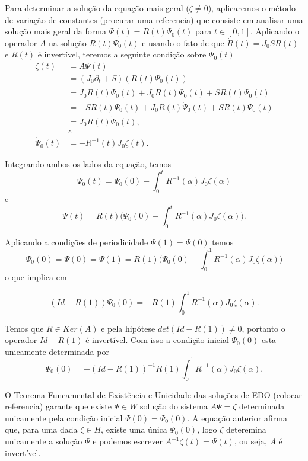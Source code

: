 \documentclass[12pt]{book}
\newcommand{\derivadaparcialabrev}[1]{\partial_{#1}}
\newcommand{\estruturacomplexa}{J_{0}}
\newcommand{\vermelho}[1]{{\color{red}#1}}
\begin{document}
	Para determinar a solução da equação mais geral ($\zeta\neq 0$), aplicaremos o método de variação de constantes \vermelho{(procurar uma referencia)} que consiste em analisar uma solução mais geral da forma $\Psi(t) = R(t)\Psi_{0}(t)$ para $t \in [0,1]$. Aplicando o operador $A$ na solução $R(t)\Psi_{0}(t)$ e usando o fato de que $\dot{R}(t) = \estruturacomplexa SR(t)$ e $R(t)$ é invertível, teremos a seguinte condição sobre $\Psi_{0}(t)$
	$$
	\begin{aligned}
		\zeta(t) 
		&= A\Psi(t)
		\\ 
		&= (\estruturacomplexa\derivadaparcialabrev{t}+S)(R(t)\Psi_{0}(t)) 
		\\ 
		&= \estruturacomplexa\dot{R}(t)\Psi_{0}(t)+\estruturacomplexa R(t)\dot{\Psi}_{0}(t) + SR(t)\Psi_{0}(t)
		\\
		&= -SR(t)\Psi_{0}(t)+\estruturacomplexa R(t)\dot{\Psi}_{0}(t) + SR(t)\Psi_{0}(t)
		\\
		&= \estruturacomplexa R(t)\dot{\Psi}_{0}(t),
		\\
		&\therefore 
		\\
		\dot{\Psi}_{0}(t) &= -R^{-1}(t)\estruturacomplexa \zeta(t).
	\end{aligned}
	$$
	
	Integrando ambos os lados da equação, temos
	$$
	\Psi_{0}(t) = \Psi_{0}(0)-\int_{0}^{t} R^{-1}(\alpha)\estruturacomplexa \zeta(\alpha)
	$$
	e
	$$
	\Psi(t) = R(t)\Big(\Psi_{0}(0)-\int_{0}^{t} R^{-1}(\alpha)\estruturacomplexa \zeta(\alpha)\Big).
	$$
	
	Aplicando a condições de periodicidade $\Psi(1) = \Psi(0)$ temos
	$$
	\Psi_{0}(0)=\Psi(0)=\Psi(1)=R(1)\Big(\Psi_{0}(0)-\int_{0}^{1} R^{-1}(\alpha)\estruturacomplexa \zeta(\alpha)\Big)
	$$
	o que implica em
	
	$$
	(Id - R(1))\Psi_{0}(0) = -R(1)\int_{0}^{1} R^{-1}(\alpha)\estruturacomplexa \zeta(\alpha).
	$$
		
	Temos que $R \in Ker(A)$ e pela hipótese $det(Id - R(1))\neq 0$, portanto o operador $Id - R(1)$ é invertível. Com isso a condição inicial $\Psi_{0}(0)$ esta unicamente determinada por
	$$
	\Psi_{0}(0) = -(Id - R(1))^{-1}R(1)\int_{0}^{1} R^{-1}(\alpha)\estruturacomplexa \zeta(\alpha).
	$$
		
	O Teorema Funcamental de Existência e Unicidade das soluções de EDO \vermelho{(colocar referencia)} garante que existe $\Psi \in W$ solução do sistema $A\Psi = \zeta$ determinada unicamente pela condição inicial $\Psi(0) = \Psi_{0}(0)$. A equação anterior afirma que, para uma dada $\zeta \in H$, existe uma única $\Psi_{0}(0)$, logo $\zeta$ deteremina unicamente a solução $\Psi$ e podemos escrever $A^{-1}\zeta(t)=\Psi(t)$, ou seja, $A$ é invertível.
	
\end{document}
